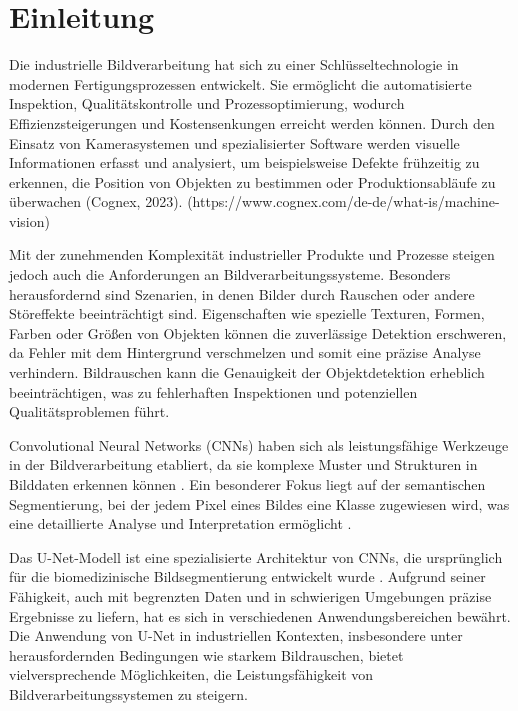 \chapter{Einleitung}\label{sec:exp_einleitung}
Die industrielle Bildverarbeitung hat sich zu einer Schlüsseltechnologie in modernen Fertigungsprozessen entwickelt. Sie ermöglicht die automatisierte Inspektion, Qualitätskontrolle und Prozessoptimierung, wodurch Effizienzsteigerungen und Kostensenkungen erreicht werden können. Durch den Einsatz von Kamerasystemen und spezialisierter Software werden visuelle Informationen erfasst und analysiert, um beispielsweise Defekte frühzeitig zu erkennen, die Position von Objekten zu bestimmen oder Produktionsabläufe zu überwachen (Cognex, 2023). (https://www.cognex.com/de-de/what-is/machine-vision)

Mit der zunehmenden Komplexität industrieller Produkte und Prozesse steigen jedoch auch die Anforderungen an Bildverarbeitungssysteme. Besonders herausfordernd sind Szenarien, in denen Bilder durch Rauschen oder andere Störeffekte beeinträchtigt sind. Eigenschaften wie spezielle Texturen, Formen, Farben oder Größen von Objekten können die zuverlässige Detektion erschweren, da Fehler mit dem Hintergrund verschmelzen und somit eine präzise Analyse verhindern. Bildrauschen kann die Genauigkeit der Objektdetektion erheblich beeinträchtigen, was zu fehlerhaften Inspektionen und potenziellen Qualitätsproblemen führt.

Convolutional Neural Networks (CNNs) haben sich als leistungsfähige Werkzeuge in der Bildverarbeitung etabliert, da sie komplexe Muster und Strukturen in Bilddaten erkennen können \cite{lecun_deep_2015}. Ein besonderer Fokus liegt auf der semantischen Segmentierung, bei der jedem Pixel eines Bildes eine Klasse zugewiesen wird, was eine detaillierte Analyse und Interpretation ermöglicht \cite{long_fully_2015}.

Das U-Net-Modell ist eine spezialisierte Architektur von CNNs, die ursprünglich für die biomedizinische Bildsegmentierung entwickelt wurde \cite{ronneberger_u-net_2015}. Aufgrund seiner Fähigkeit, auch mit begrenzten Daten und in schwierigen Umgebungen präzise Ergebnisse zu liefern, hat es sich in verschiedenen Anwendungsbereichen bewährt. Die Anwendung von U-Net in industriellen Kontexten, insbesondere unter herausfordernden Bedingungen wie starkem Bildrauschen, bietet vielversprechende Möglichkeiten, die Leistungsfähigkeit von Bildverarbeitungssystemen zu steigern.


